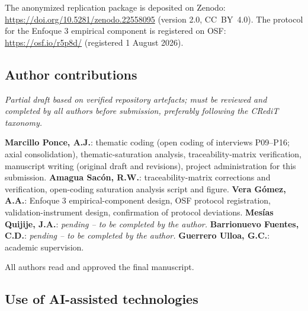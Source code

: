 \documentclass[12pt]{article}
\begin{document}
\par
The anonymized replication package is deposited on Zenodo:
\href{https://doi.org/10.5281/zenodo.22558095}{https://doi.org/10.5281/zenodo.22558095}
(version 2.0, CC~BY~4.0). The protocol for the Enfoque 3 empirical
component is registered on OSF:
\href{https://osf.io/r5p8d/}{https://osf.io/r5p8d/} (registered
1 August 2026).


\subsection*{Author contributions}

\textit{Partial draft based on verified repository artefacts; must be
reviewed and completed by all authors before submission, preferably
following the CRediT taxonomy.}

\textbf{Marcillo Ponce, A.J.}: thematic coding (open coding of
interviews P09--P16; axial consolidation), thematic-saturation
analysis, traceability-matrix verification, manuscript writing
(original draft and revisions), project administration for this
submission.
\textbf{Amagua Sacón, R.W.}: traceability-matrix corrections and
verification, open-coding saturation analysis script and figure.
\textbf{Vera Gómez, A.A.}: Enfoque 3 empirical-component design,
OSF protocol registration, validation-instrument design, confirmation
of protocol deviations.
\textbf{Mesías Quijije, J.A.}: \textit{pending -- to be completed by
the author.}
\textbf{Barrionuevo Fuentes, C.D.}: \textit{pending -- to be completed
by the author.}
\textbf{Guerrero Ulloa, G.C.}: academic supervision.

All authors read and approved the final manuscript.


\subsection*{Use of AI-assisted technologies}
\end{document}
